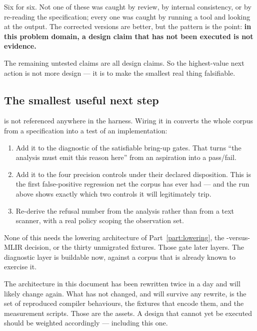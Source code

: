 Six for six. Not one of these was caught by review, by internal consistency, or
by re-reading the specification; every one was caught by running a tool and
looking at the output. The corrected versions are better, but the pattern is the
point: \textbf{in this problem domain, a design claim that has not been executed
is not evidence.}

The remaining untested claims are all design claims. So the highest-value next
action is not more design --- it is to make the smallest real thing falsifiable.

\subsection{The smallest useful next step}

 is not referenced anywhere in the harness. Wiring it in converts
the whole corpus from a specification into a test of an implementation:

\begin{enumerate}[nosep,leftmargin=1.6em]
\item Add it to the diagnostic  of the satisfiable bring-up gates. That
      turns ``the analysis must emit this reason here'' from an aspiration into a
      pass/fail.
\item Add it to the four precision controls under their declared
      \RelReq{} disposition. This is the first false-positive regression net the
      corpus has ever had --- and the run above shows exactly which two controls
      it will legitimately trip.
\item Re-derive the refusal number from the analysis rather than from a text
      scanner, with a real policy scoping the observation set.
\end{enumerate}

None of this needs the lowering architecture of Part~\ref{part:lowering}, the
-versus-MLIR decision, or the thirty unmigrated fixtures. Those gate
later layers. The diagnostic layer is buildable now, against a corpus that is
already known to exercise it.

\begin{remark}
The architecture in this document has been rewritten twice in a day and will
likely change again. What has not changed, and will survive any rewrite, is the
set of reproduced compiler behaviours, the fixtures that encode them, and the
measurement scripts. Those are the assets. A design that cannot yet be executed
should be weighted accordingly --- including this one.
\end{remark}

